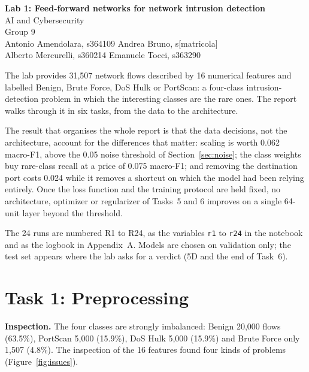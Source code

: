 \documentclass[9pt]{extarticle}
\newcommand{\run}[1]{\textsf{#1}}   %
\begin{document}
\begin{center}
{\Large\bfseries Lab 1: Feed-forward networks for network intrusion detection}\\[3pt]
{\normalsize AI and Cybersecurity}\\[6pt]
Group 9\\[2pt]
{\small Antonio Amendolara, s364109 \quad Andrea Bruno, s[matricola]\\
Alberto Mercurelli, s360214 \quad Emanuele Tocci, s363290}
\end{center}

\vspace{-2pt}

The lab provides 31,507 network flows described by 16 numerical features and labelled Benign,
Brute Force, DoS Hulk or PortScan: a four-class intrusion-detection problem in which the interesting
classes are the rare ones. The report walks through it in six tasks, from the data to the
architecture.

The result that organises the whole report is that the data decisions, not the architecture,
account for the differences that matter: scaling is worth 0.062 macro-F1, above the 0.05 noise
threshold of Section~\ref{sec:noise}; the class weights buy rare-class recall at a price of 0.075
macro-F1; and removing the destination port costs 0.024 while it removes a shortcut on which the
model had been relying entirely. Once the loss function and the training protocol are held fixed,
no architecture, optimizer or regularizer of Tasks~5 and 6 improves on a single 64-unit layer
beyond the threshold.

The 24 runs are numbered \run{R1} to \run{R24}, as the variables \texttt{r1} to \texttt{r24} in the
notebook and as the logbook in Appendix~A. Models are chosen on validation only; the test set
appears where the lab asks for a verdict (5D and the end of Task~6).

\section{Task 1: Preprocessing}\label{sec:task1}

\textbf{Inspection.} The four classes are strongly imbalanced: Benign 20,000 flows (63.5\%),
PortScan 5,000 (15.9\%), DoS Hulk 5,000 (15.9\%) and Brute Force only 1,507 (4.8\%). The
inspection of the 16 features found four kinds of problems (Figure~\ref{fig:issues}).
\end{document}
